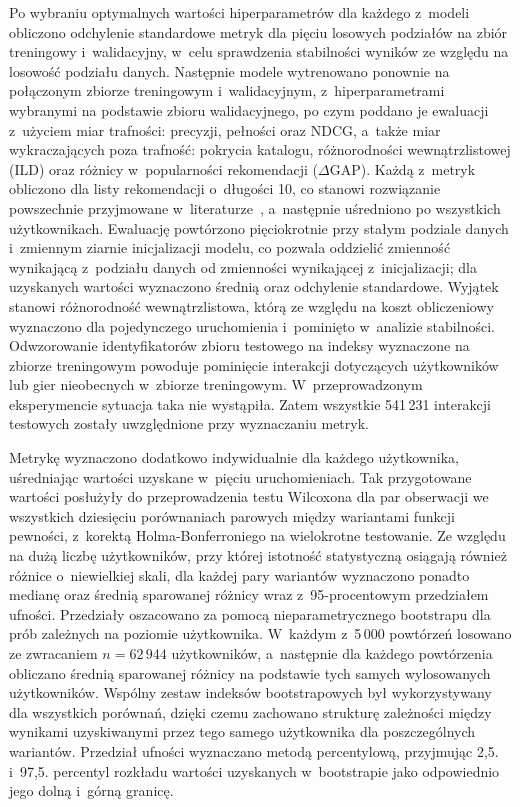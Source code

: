 Po wybraniu optymalnych wartości hiperparametrów dla każdego z~modeli obliczono odchylenie standardowe metryk dla pięciu losowych podziałów na zbiór treningowy i~walidacyjny, w~celu sprawdzenia stabilności wyników ze względu na losowość podziału danych. Następnie modele wytrenowano ponownie na połączonym zbiorze treningowym i~walidacyjnym, z~hiperparametrami wybranymi na podstawie zbioru walidacyjnego, po czym poddano je ewaluacji z~użyciem miar trafności:  precyzji, pełności oraz $\text{NDCG}$, a~także miar wykraczających poza trafność: pokrycia katalogu, różnorodności wewnątrzlistowej ($\text{ILD}$) oraz różnicy w~popularności rekomendacji ($\Delta\text{GAP}$). Każdą z~metryk obliczono dla listy rekomendacji o~długości 10, co stanowi rozwiązanie powszechnie przyjmowane w~literaturze~\cite{he2017neural,rendle2020neural}, a~następnie uśredniono po wszystkich użytkownikach. Ewaluację powtórzono pięciokrotnie przy stałym podziale danych i~zmiennym ziarnie inicjalizacji modelu, co pozwala oddzielić zmienność wynikającą z~podziału danych od zmienności wynikającej z~inicjalizacji; dla uzyskanych wartości wyznaczono średnią oraz odchylenie standardowe. Wyjątek stanowi różnorodność wewnątrzlistowa, którą ze względu na koszt obliczeniowy wyznaczono dla pojedynczego uruchomienia i~pominięto w~analizie stabilności. Odwzorowanie identyfikatorów zbioru testowego na indeksy wyznaczone na zbiorze treningowym powoduje pominięcie interakcji dotyczących użytkowników lub gier nieobecnych w~zbiorze treningowym. W~przeprowadzonym eksperymencie sytuacja taka nie wystąpiła. Zatem wszystkie 541\,231 interakcji testowych zostały uwzględnione przy wyznaczaniu metryk.

Metrykę \ndcg{} wyznaczono dodatkowo indywidualnie dla każdego użytkownika, uśredniając wartości uzyskane w~pięciu uruchomieniach. Tak przygotowane wartości posłużyły do przeprowadzenia testu Wilcoxona dla par obserwacji we wszystkich dziesięciu porównaniach parowych między wariantami funkcji pewności, z~korektą Holma-Bonferroniego na wielokrotne testowanie. Ze względu na dużą liczbę użytkowników, przy której istotność statystyczną osiągają również różnice o~niewielkiej skali, dla każdej pary wariantów wyznaczono ponadto medianę oraz średnią sparowanej różnicy \ndcg{} wraz z~95-procentowym przedziałem ufności. Przedziały oszacowano za pomocą nieparametrycznego bootstrapu dla prób zależnych na poziomie użytkownika. W~każdym z~5\,000 powtórzeń losowano ze zwracaniem $n=62\,944$ użytkowników, a~następnie dla każdego powtórzenia obliczano średnią sparowanej różnicy \ndcg{} na podstawie tych samych wylosowanych użytkowników. Wspólny zestaw indeksów bootstrapowych był wykorzystywany dla wszystkich porównań, dzięki czemu zachowano strukturę zależności między wynikami uzyskiwanymi przez tego samego użytkownika dla poszczególnych wariantów. Przedział ufności wyznaczano metodą percentylową, przyjmując 2{,}5. i~97{,}5. percentyl rozkładu wartości uzyskanych w~bootstrapie jako odpowiednio jego dolną i~górną granicę.

